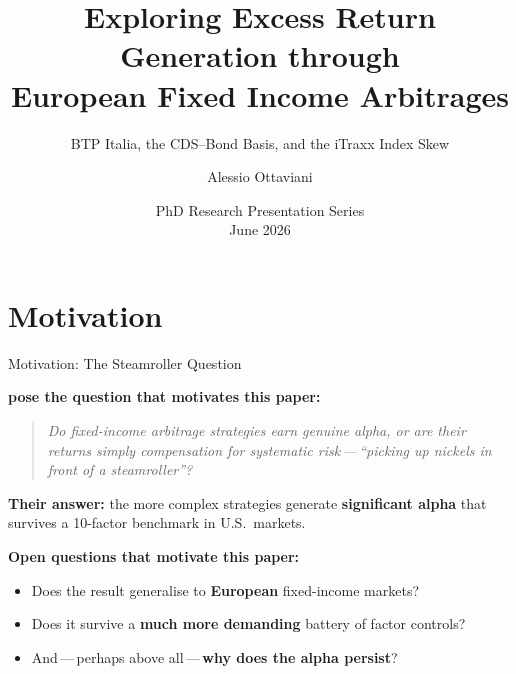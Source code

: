 \documentclass[aspectratio=169,11pt]{beamer}
\title[European FI Arbitrages]{Exploring Excess Return Generation through \\
  European Fixed Income Arbitrages}
\subtitle{BTP Italia, the CDS--Bond Basis, and the iTraxx Index Skew}
\author[A.\ Ottaviani]{Alessio Ottaviani}
\institute[EDHEC]{
  EDHEC Business School \\[0.15cm]
  \textit{Supervisor:} Prof.\ Riccardo Rebonato
}
\date{PhD Research Presentation Series \\ June 2026}
\newcommand{\hlt}[1]{\textcolor{edhecred}{\textbf{#1}}}     %
\newcommand{\hltb}[1]{\textcolor{accentblue}{\textbf{#1}}}  %
\begin{document}

\begin{frame}[plain]
  \titlepage
\end{frame}

\section{Motivation}

\begin{frame}[t]{Motivation: The Steamroller Question}
\vspace{0.2cm}

\textbf{\citet{duarte2007risk} pose the question that motivates this paper:}

\vspace{0.35cm}
\begin{quote}
  \itshape
  Do fixed-income arbitrage strategies earn genuine alpha, or are their returns
  simply compensation for systematic risk\,---\,``picking up nickels in front
  of a steamroller''?
\end{quote}

\vspace{0.35cm}

\textbf{Their answer:} the more complex strategies generate \hlt{significant alpha}
that survives a 10-factor benchmark in U.S.\ markets.

\vspace{0.5cm}

\textbf{Open questions that motivate this paper:}
\begin{itemize}\itemsep=0.2cm
  \item Does the result generalise to \hltb{European} fixed-income markets?
  \item Does it survive a \hltb{much more demanding} battery of factor controls?
  \item And\,---\,perhaps above all\,---\,\hltb{why does the alpha persist}?
\end{itemize}

\end{frame}
\end{document}
